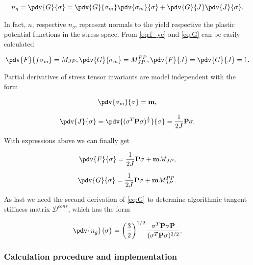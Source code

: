 \begin{equation}
	n_g = \pdv{G}{\sigma} = \pdv{G}{\sigma_m} \pdv{\sigma_m}{\sigma} + \pdv{G}{J}\pdv{J}{\sigma}.
\end{equation}

In fact, $n$, respective $n_g$, represent normals to the yield respective the plastic potential functions in the stress space. From \ref{eq:f_yc} and \ref{eq:G} can be easily calculated 

\begin{equation}
	\pdv{F}{f\sigma_m} = M_{JP}, \pdv{G}{\sigma_m} = M_{JP}^{PP}, \pdv{F}{J} = \pdv{G}{J} = 1.
\end{equation}

Partial derivatives of stress tensor invariants are model independent with the form 

\begin{equation}
	\pdv{\sigma_m}{\sigma} = \text{\textbf{m}},
\end{equation}

\begin{equation}
	\pdv{J}{\sigma} = \pdv{(\sigma^T\text{\textbf{P}}\sigma)^{\frac{1}{2}}}{\sigma} = \dfrac{1}{2J} \text{\textbf{P}}\sigma.
\end{equation}

With expressions above we can finally get 

\begin{equation}
	\pdv{F}{\sigma} = \dfrac{1}{2J}\text{\textbf{P}}\sigma + \text{\textbf{m}}M_{JP},
\end{equation}

\begin{equation}
	\pdv{G}{\sigma} = \dfrac{1}{2J}\text{\textbf{P}}\sigma + \text{\textbf{m}}M_{JP}^{PP}.	
\end{equation}

As last we need the second derivation of \ref{eq:G} to determine algorithmic tangent stiffness matrix $\mathcal{D}^{cons}$, which has the form 

\begin{equation}
	\pdv{n_g}{\sigma} = \left( \dfrac{3}{2} \right)^{1/2} \dfrac{\sigma^T \text{\textbf{P}} \sigma \text{\textbf{P}}}{(\sigma^T \text{\textbf{P}} \sigma)^{3/2}}.
\end{equation}

\subsubsection{Calculation procedure and implementation}\label{sec:drucker-prager_count}
\indent

